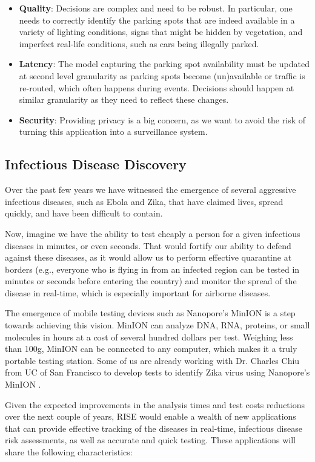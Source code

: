 \begin{itemize}[noitemsep,topsep=0pt,parsep=0pt,partopsep=0pt]
\item {\bf Quality}: Decisions are complex and need to be robust. In particular, one needs to correctly identify the parking spots that are indeed available in a variety of lighting conditions, signs that might be hidden by vegetation, and imperfect real-life conditions, such as cars being illegally parked.
\item {\bf Latency}: The model capturing the parking spot availability must be updated at second level granularity as parking spots become (un)available or traffic is re-routed, which often happens during events. Decisions should happen at similar granularity as they need to reflect these changes.
\item {\bf Security}: Providing privacy is a big concern, as we want to avoid the risk of turning this application into a surveillance system.
\end{itemize}

\subsection{Infectious Disease Discovery}

Over the past few years we have witnessed the emergence of several aggressive infectious diseases, such as Ebola and Zika, that have claimed lives, spread quickly, and have been difficult to contain. 

Now, imagine  we have the ability to test cheaply a person for a given infectious diseases in minutes, or even seconds. That would fortify our ability to defend against these diseases, as it would allow us to perform effective quarantine at borders (e.g., everyone who is flying in from an infected region can be tested in minutes or seconds before entering the country) and monitor the spread of the disease in real-time, which is especially important for airborne diseases.

The emergence of mobile testing devices such as Nanopore's MinION is a step towards achieving this vision. MinION can analyze DNA, RNA, proteins, or small molecules in hours at a cost of several hundred dollars per test. Weighing less than 100g, MinION can be connected to any computer, which makes it a truly portable testing station. Some of us are already working with Dr. Charles Chiu from UC of San Francisco to develop tests to identify Zika virus using Nanopore's MinION . 

Given the expected improvements in the analysis times and test costs reductions over the next couple of years, RISE would enable a wealth of new applications that can provide effective tracking of the diseases in real-time, infectious disease risk assessments, as well as accurate and quick testing. These applications will share the following characteristics:

